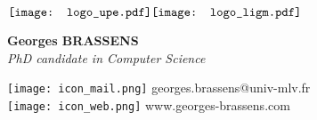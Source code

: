 \documentclass[12pt,a4paper]{memoir}
\begin{document}
    \begin{minipage}[t]{0.93\textwidth}
        $
            \vcenter{
                \hbox{\texttt{[image: logo\_upe.pdf]}}
            }
            \hfill
            \vcenter{
                \hbox{\texttt{[image: logo\_ligm.pdf]}}
            }
        $
    \end{minipage}

    \vfill

    \begin{Spacing}{1.00}
    
    \noindent

    \begin{minipage}[t]{0.9\textwidth}
    \begin{center}
        {\large    \textbf{Georges BRASSENS}}\\
        
        {\textit{PhD candidate in Computer Science}}
    \end{center}
    \end{minipage}

    \vfill

    \noindent

    \begin{minipage}[t]{.93\textwidth}
    \begin{flushright}
    \tiny
        \texttt{[image: icon\_mail.png]} georges.brassens@univ-mlv.fr \\
        \texttt{[image: icon\_web.png]} www.georges-brassens.com
    \end{flushright}
    \end{minipage}

    \end{Spacing}
\end{document}
